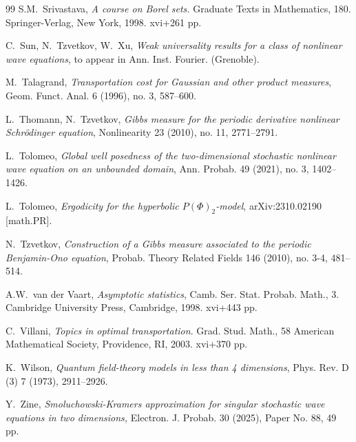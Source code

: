 \documentclass[letterpaper, 11pt,  reqno]{amsart}
\newcommand{\1}{\hspace{0.5mm}\text{I}\hspace{0.2mm}}
\numberwithin{equation}{section}
\numberwithin{theorem}{section}
\begin{document}
\begin{thebibliography}{99}
S.M.~Srivastava, 
{\it A course on Borel sets.}
Graduate Texts in Mathematics, 180. Springer-Verlag, New York, 1998. xvi+261 pp.



C.~Sun, N.~Tzvetkov, W.~Xu,
{\it Weak universality results for a class of nonlinear wave equations}, 
to appear in Ann. Inst. Fourier.  (Grenoble).


M.~Talagrand, 
{\it Transportation cost for Gaussian and other product measures}, 
Geom. Funct. Anal. 6 (1996), no. 3, 587--600.


L.~Thomann, N.~Tzvetkov, 
{\it Gibbs measure for the periodic derivative nonlinear Schr\"odinger equation},
Nonlinearity 23 (2010), no. 11, 2771--2791.


L.~Tolomeo, 
{\it Global well posedness of the two-dimensional stochastic nonlinear wave equation on an unbounded domain}, 
Ann. Probab. 49 (2021), no. 3, 1402--1426. 


L.~Tolomeo,
{\it Ergodicity for the hyperbolic $P(\Phi)_2$-model},
arXiv:2310.02190 [math.PR].


N.~Tzvetkov,
{\it Construction of a Gibbs measure associated
to the periodic Benjamin-Ono equation}, 
Probab. Theory Related Fields 146 (2010), no. 3-4, 481--514.


A.W.~van der Vaart,
{\it Asymptotic statistics}, 
Camb. Ser. Stat. Probab. Math., 3.
Cambridge University Press, Cambridge, 1998. xvi+443 pp.




C.~Villani,
{\it Topics in optimal transportation}.
Grad. Stud. Math., 58
American Mathematical Society, Providence, RI, 2003. xvi+370 pp.


K.~Wilson, 
{\it Quantum field-theory models in less than 4 dimensions}, 
Phys. Rev. D (3) 7 (1973), 2911--2926. 

Y.~Zine,
{\it Smoluchowski-Kramers approximation for singular stochastic wave equations in two dimensions,}
 Electron. J. Probab. 30 (2025), Paper No. 88, 49 pp.






\end{thebibliography}
\end{document}
